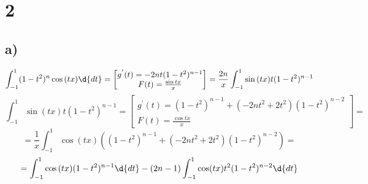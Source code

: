 

	\section*{2}
	\subsection*{a)}
	$$\int_{-1}^{1}(1-t^2)^n \cos{(tx)\d{dt}} = \begin{bmatrix}
		g^{'}(t) = -2nt(1-t^2)^{n-1}\\
		F(t) = \frac{\sin tx}{x}
	\end{bmatrix}= \frac{2n}{x}\int_{-1}^{1}\sin{(tx)}t(1-t^2)^{n-1}  $$
	$$\int_{-1}^{1}\sin{(tx)}t(1-t^2)^{n-1} =\begin{bmatrix}
		g^{'}(t) =(1-t^2)^{n-1} + (-2nt^2+2t^2) (1-t^2)^{n-2}\\
		F(t) = \frac{\cos tx}{x}
	\end{bmatrix}= $$
	$$= \frac1x\int_{-1}^{1}\cos{(tx)}((1-t^2)^{n-1} + (-2nt^2+2t^2) (1-t^2)^{n-2}) = $$
	$$=\int_{-1}^1\cos{(tx)}(1-t^2)^{n-1}\d{dt} -(2n-1)\int_{-1}^1\cos(tx)t^2(1-t^2)^{n-2}\d{dt}$$
